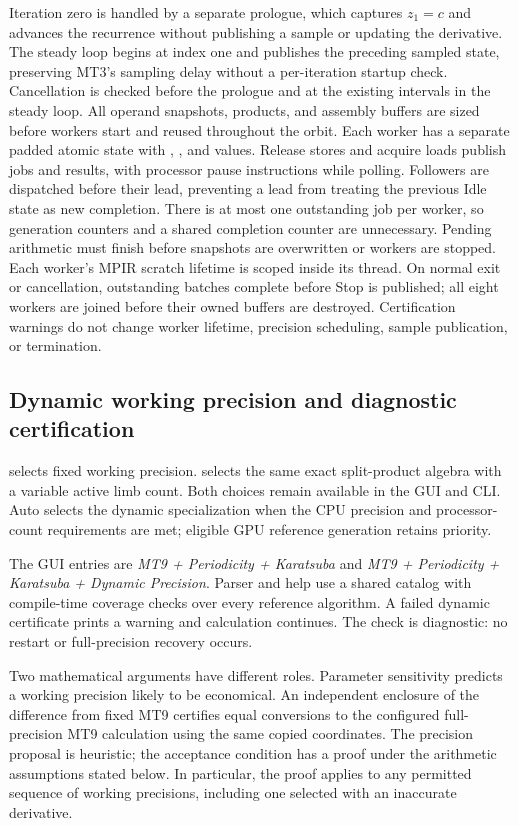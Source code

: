 Iteration zero is handled by a separate prologue, which captures $z_1=c$ and
advances the recurrence without publishing a sample or updating the derivative.
The steady loop begins at index one and publishes the preceding sampled state,
preserving MT3's sampling delay without a per-iteration startup check. Cancellation
is checked before the prologue and at the existing intervals in the steady loop.
All operand snapshots, products, and assembly buffers are sized before workers
start and reused throughout the orbit. Each worker has a separate padded
atomic state with , , and  values. Release
stores and acquire loads publish jobs and results, with processor pause
instructions while polling. Followers are dispatched before their lead,
preventing a lead from treating the previous Idle state as new completion.
There is at most one outstanding job per worker, so generation counters and
a shared completion counter are unnecessary. Pending arithmetic must finish
before snapshots are overwritten or workers are stopped.
Each worker's MPIR scratch lifetime is scoped inside its thread. On normal
exit or cancellation, outstanding batches complete before Stop is published;
all eight workers are joined before their owned buffers are destroyed.
Certification warnings do not change worker lifetime, precision scheduling,
sample publication, or termination.

\subsection{Dynamic working precision and diagnostic certification}
\label{subsec:ref-orbit-dynamic-precision}

 selects fixed working precision.
 selects the same exact
split-product algebra with a variable active limb count. Both choices remain
available in the GUI and CLI. Auto selects the dynamic specialization when
the CPU precision and processor-count requirements are met; eligible GPU
reference generation retains priority.

The GUI entries are \emph{MT9 + Periodicity + Karatsuba} and
\emph{MT9 + Periodicity + Karatsuba + Dynamic Precision}. Parser and help use
a shared catalog with compile-time coverage checks over every reference algorithm.
A failed dynamic certificate prints a warning and calculation continues.
The check is diagnostic: no restart or full-precision recovery occurs.

Two mathematical arguments have different roles. Parameter sensitivity predicts
a working precision likely to be economical. An independent enclosure of the
difference from fixed MT9 certifies equal conversions to the configured
full-precision MT9 calculation using the same copied coordinates.
The precision proposal is heuristic; the acceptance condition has a proof under
the arithmetic assumptions stated below. In particular, the proof applies to
any permitted sequence of working precisions, including one selected with an
inaccurate derivative.

